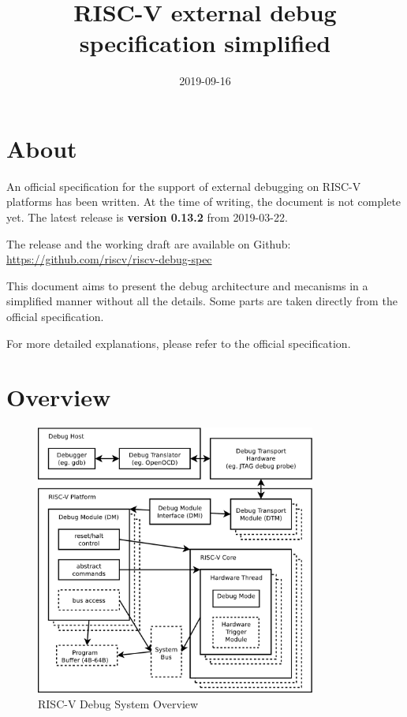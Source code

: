 \documentclass{article}
\title{RISC-V external debug specification simplified}
\date{2019-09-16}
\begin{document}
	\maketitle
	
	\section{About}
	
	An official specification for the support of external debugging on RISC-V platforms has been written. At the time of writing, the document is not complete yet. The latest release is \textbf{version 0.13.2} from 2019-03-22.
	
	The release and the working draft are available on Github: \url{https://github.com/riscv/riscv-debug-spec}
	
	This document aims to present the debug architecture and mecanisms in a simplified manner without all the details. Some parts are taken directly from the official specification.
	
	For more detailed explanations, please refer to the official specification.
	
	\newpage
	\section{Overview}
	
	\begin{figure}[H]
   	\centering
   	\includegraphics[width=0.82\textwidth]{overview.pdf}
   	\caption{RISC-V Debug System Overview}
   	\label{fig:overview}
	\end{figure}
	
\end{document}

